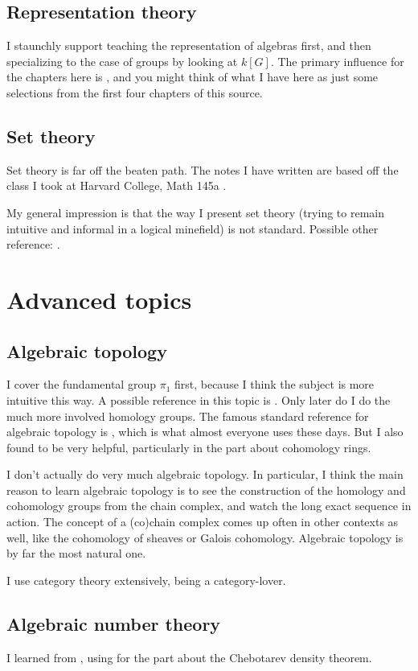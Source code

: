 \subsection{Representation theory}
I staunchly support teaching the representation of algebras first,
and then specializing to the case of groups by looking at $k[G]$.
The primary influence for the chapters here is \cite{ref:etingof},
and you might think of what I have here as just some selections
from the first four chapters of this source.

\subsection{Set theory}
Set theory is far off the beaten path.
The notes I have written are based off the class
I took at Harvard College, Math 145a \cite{ref:145a}.

My general impression is that the way I present set theory
(trying to remain intuitive and informal in a logical minefield)
is not standard. Possible other reference: \cite{ref:miquel}.

\section{Advanced topics}
\subsection{Algebraic topology}
I cover the fundamental group $\pi_1$ first, because I think the subject is more
intuitive this way. A possible reference in this topic is \cite{ref:munkres}.
Only later do I do the much more involved homology groups.
The famous standard reference for algebraic topology is \cite{ref:hatcher},
which is what almost everyone uses these days.
But I also found \cite{ref:maxim752} to be very helpful,
particularly in the part about cohomology rings.

I don't actually do very much algebraic topology.
In particular, I think the main reason to learn algebraic topology
is to see the construction of the homology and cohomology groups
from the chain complex, and watch the long exact sequence in action.
The concept of a (co)chain complex comes up often in other contexts as well,
like the cohomology of sheaves or Galois cohomology.
Algebraic topology is by far the most natural one.

I use category theory extensively, being a category-lover.

\subsection{Algebraic number theory}
I learned from \cite{ref:oggier_NT},
using \cite{ref:lenstra_chebotarev}
for the part about the Chebotarev density theorem.

